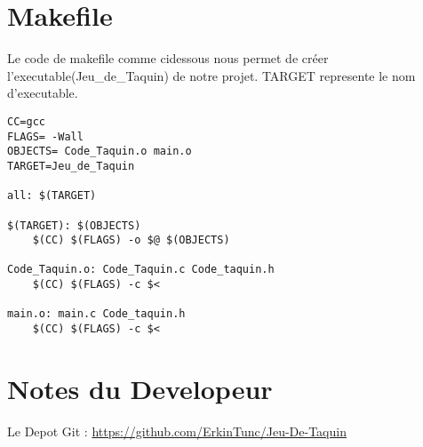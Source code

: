 \documentclass{article}
\begin{document}
\section{Makefile}
Le code de makefile comme ci\-dessous nous permet de créer l'executable(Jeu\_de\_Taquin) de notre projet.
TARGET represente le nom d'executable.
\begin{lstlisting}
CC=gcc
FLAGS= -Wall
OBJECTS= Code_Taquin.o main.o
TARGET=Jeu_de_Taquin

all: $(TARGET)

$(TARGET): $(OBJECTS)
	$(CC) $(FLAGS) -o $@ $(OBJECTS)

Code_Taquin.o: Code_Taquin.c Code_taquin.h
	$(CC) $(FLAGS) -c $<

main.o: main.c Code_taquin.h
	$(CC) $(FLAGS) -c $<
\end{lstlisting}

\section{Notes du Developeur}
Le Depot Git : \url{https://github.com/ErkinTunc/Jeu-De-Taquin} \\
\end{document}
